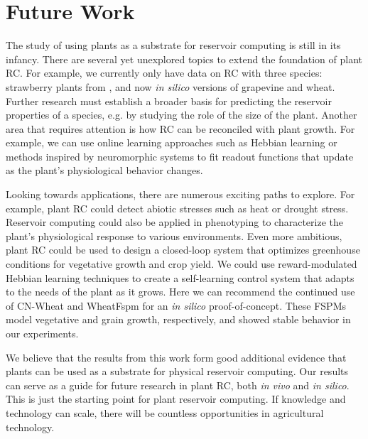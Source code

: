 \section{Future Work}

The study of using plants as a substrate for reservoir computing is still in its infancy.
There are several yet unexplored topics to extend the foundation of plant RC.
For example, we currently only have data on RC with three species: strawberry plants from \citet{pieters_reservoir_2022}, and now \textit{in silico} versions of grapevine and wheat.
Further research must establish a broader basis for predicting the reservoir properties of a species, e.g. by studying the role of the size of the plant.
Another area that requires attention is how RC can be reconciled with plant growth.
For example, we can use online learning approaches such as Hebbian learning or methods inspired by neuromorphic systems to fit readout functions that update as the plant's physiological behavior changes.

Looking towards applications, there are numerous exciting paths to explore.
For example, plant RC could detect abiotic stresses such as heat or drought stress.
Reservoir computing could also be applied in phenotyping to characterize the plant's physiological response to various environments.
Even more ambitious, plant RC could be used to design a closed-loop system that optimizes greenhouse conditions for vegetative growth and crop yield.
We could use reward-modulated Hebbian learning techniques \citep{burms_reward-modulated_2015} to create a self-learning control system that adapts to the needs of the plant as it grows.
Here we can recommend the continued use of CN-Wheat \citep{barillot_cn-wheat_2016} and WheatFspm \citep{gauthier_functional_2020} for an \textit{in silico} proof-of-concept. 
These FSPMs model vegetative and grain growth, respectively, and showed stable behavior in our experiments.


\vspace{0.5cm}

We believe that the results from this work form good additional evidence that plants can be used as a substrate for physical reservoir computing.
Our results can serve as a guide for future research in plant RC, both \textit{in vivo} and \textit{in silico}.
This is just the starting point for plant reservoir computing. 
If knowledge and technology can scale, there will be countless opportunities in agricultural technology.
